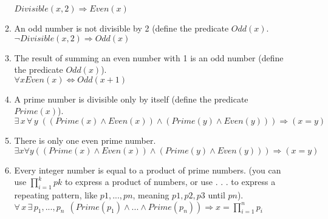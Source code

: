 \documentclass[paper=a4, fontsize=11pt]{scrartcl} %
\numberwithin{equation}{section} %
\numberwithin{figure}{section} %
\numberwithin{table}{section} %
\begin{document}
\begin{enumerate}
\begin{enumerate}
		$Divisible(x, 2) \Rightarrow Even(x)$\\

		\item
		An odd number is not divisible by 2 (define the predicate $Odd(x)$.\\
		
		$\neg Divisible(x, 2) \Rightarrow Odd(x)$\\

		\item
		The result of summing an even number with 1 is an odd number (define the predicate $Odd(x)$).\\
		
		$\forall x Even(x) \Leftrightarrow Odd(x+1)$\\

		\item
		A prime number is divisible only by itself (define the predicate $Prime(x)$).\\

		$\exists \,x \, \forall \,y \; ((Prime(x) \land Even(x)) \land (Prime(y) \land Even(y))) \Rightarrow (x = y)$\\

		\item
		There is only one even prime number.\\
		
		$\exists x \forall y ((Prime(x) \wedge Even(x)) \wedge (Prime(y) \wedge Even(y))) \Rightarrow (x = y)$\\

		\item
		Every integer number is equal to a product of prime numbers. (you can use $\prod^k_{i=1} pk$ to express a product of numbers, or use . . . to express a repeating pattern, like $p1,..., pn$, meaning $p1, p2, p3$ until $pn$).\\
		
		$ \forall \, x \, \exists \, p_1,...,p_n \, \; (Prime(p_1) \land ... \land Prime(p_n)) \Rightarrow x = \prod_{i=1}^n p_i$

	\end{enumerate}
	
\end{enumerate}
\end{document}
